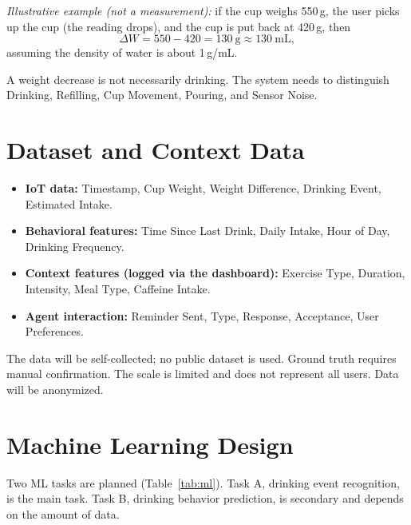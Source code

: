 \documentclass[conference]{IEEEtran}
\begin{document}
\textit{Illustrative example (not a measurement):} if the cup weighs 550\,g, the user picks up the cup (the reading drops), and the cup is put back at 420\,g, then
\begin{equation}
\Delta W = 550 - 420 = 130\ \text{g} \approx 130\ \text{mL},
\end{equation}
assuming the density of water is about 1\,g/mL.

A weight decrease is not necessarily drinking. The system needs to distinguish Drinking, Refilling, Cup Movement, Pouring, and Sensor Noise.

\section{Dataset and Context Data}

\begin{itemize}
\item \textbf{IoT data:} Timestamp, Cup Weight, Weight Difference, Drinking Event, Estimated Intake.
\item \textbf{Behavioral features:} Time Since Last Drink, Daily Intake, Hour of Day, Drinking Frequency.
\item \textbf{Context features (logged via the dashboard):} Exercise Type, Duration, Intensity, Meal Type, Caffeine Intake.
\item \textbf{Agent interaction:} Reminder Sent, Type, Response, Acceptance, User Preferences.
\end{itemize}
The data will be self-collected; no public dataset is used. Ground truth requires manual confirmation. The scale is limited and does not represent all users. Data will be anonymized.

\section{Machine Learning Design}

Two ML tasks are planned (Table~\ref{tab:ml}). Task A, drinking event recognition, is the main task. Task B, drinking behavior prediction, is secondary and depends on the amount of data.
\end{document}
